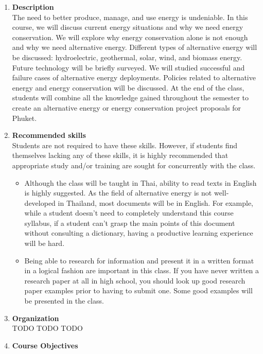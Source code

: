 \documentclass[a4paper,12pt]{article}
\begin{document}
\begin{enumerate}[label=\textbf{\Alph*}]
    \item \textbf{Description} \hfill \\
    The need to better produce, manage, and use energy is undeniable. In this course, we will discuss current energy situations and why we need energy conservation. We will explore why energy conservation alone is not enough and why we need alternative energy. Different types of alternative energy will be discussed: hydroelectric, geothermal, solar, wind, and biomass energy. Future technology will be briefly surveyed. We will studied successful and failure cases of alternative energy deployments. Policies related to alternative energy and energy conservation will be discussed. At the end of the class, students will combine all the knowledge gained throughout the semester to create an alternative energy or energy conservation project proposals for Phuket.
    \item \textbf{Recommended skills} \hfill \\
        Students are not required to have these skills. However, if students find themselves lacking any of these skills, it is highly recommended that appropriate study and/or training are sought for concurrently with the class.
        \begin{itemize}
            \item Although the class will be taught in Thai, ability to read texts in English is highly suggested. As the field of alternative energy is not well-developed in Thailand, most documents will be in English. For example, while a student doesn't need to completely understand this course syllabus, if a student can't grasp the main points of this document without consulting a dictionary, having a productive learning experience will be hard. 
            \item Being able to research for information and present it in a written format in a logical fashion are important in this class. If you have never written a research paper at all in high school, you should look up good research paper examples prior to having to submit one. Some good examples will be presented in the class.
        \end{itemize}
    \item \textbf{Organization} \hfill \\
    TODO TODO TODO
    \item \textbf{Course Objectives} \hfill \\
    \begin{enumerate}[label=\arabic*.]

\end{enumerate}
\end{enumerate}
\end{document}
